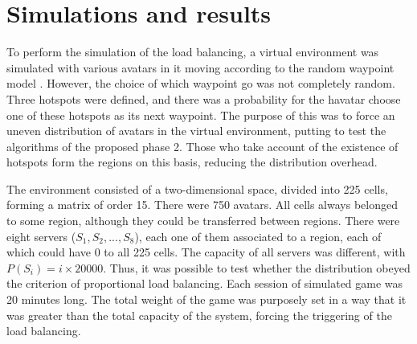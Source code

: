 \section{Simulations and results}
\label{sec:simulations}


To perform the simulation of the load balancing, a virtual environment was simulated with various avatars in it moving according to the random waypoint model \cite{bettstetter2004spr}. However, the choice of which waypoint go was not completely random. Three hotspots were defined, and there was a probability for the havatar choose one of these hotspots as its next waypoint. The purpose of this was to force an uneven distribution of avatars in the virtual environment, putting to test the algorithms of the proposed phase 2. Those who take account of the existence of hotspots form the regions on this basis, reducing the distribution overhead.

The environment consisted of a two-dimensional space, divided into 225 cells, forming a matrix of order 15. There were 750 avatars. All cells always belonged to some region, although they could be transferred between regions. There were eight servers ($S_1, S_2, ..., S_8$), each one of them associated to a region, each of which could have 0 to all 225 cells. The capacity of all servers was different, with $P(S_i) = i \times 20000$. Thus, it was possible to test whether the distribution obeyed the criterion of proportional load balancing. Each session of simulated game was 20 minutes long. The total weight of the game was purposely set in a way that it was greater than the total capacity of the system, forcing the triggering of the load balancing.

